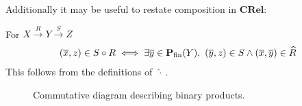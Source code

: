 Additionally it may be useful to restate composition in $\mathbf{CRel}$:

\begin{definition}\label{def:crel-comp}
For $X\overset{R}\longrightarrow Y\overset{S}\longrightarrow Z$
\begin{align*}
  (\overline{x},z)\in S\circ R\iff\exists\overline{y}\in\mathbf{P}_{\operatorname{fin}}(Y)\ldotp~(\overline{y},z)\in S\land(\overline{x},\overline{y})\in\widehat{R}
\end{align*}
This follows from the definitions of $~\widehat{\cdot}~$.
\end{definition}

\begin{figure}
  \caption{Commutative diagram describing binary products.}\label{fig:crel-products}
  \begin{center}
  \end{center}
\end{figure}

